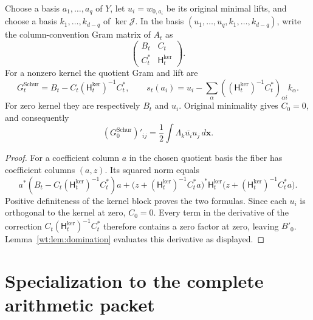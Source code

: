 \begin{proposition}
\label{wt:prop:Schur}
Choose a basis $a_1,\ldots,a_q$ of $Y$, let $u_i=w_{0,a_i}$
be its original minimal lifts, and choose a basis
$k_1,\ldots,k_{d-q}$ of $\ker\mathcal J$.  In the basis
$(u_1,\ldots,u_q,k_1,\ldots,k_{d-q})$, write the column-convention
Gram matrix of $A_t$ as
\[
 \begin{pmatrix}B_t&C_t\\C_t^*&\mathsf H_t^{\mathrm{ker}}\end{pmatrix}.
\]
For a nonzero kernel the quotient Gram and lift are
\begin{equation}\label{wt:eq:Schur}
 G_t^{\mathrm{Schur}}=B_t-C_t(\mathsf H_t^{\mathrm{ker}})^{-1}C_t^*,
 \qquad
 s_t(a_i)=u_i-\sum_\alpha
   ((\mathsf H_t^{\mathrm{ker}})^{-1}C_t^*)_{\alpha i}k_\alpha.
\end{equation}
For zero kernel they are respectively $B_t$ and $u_i$.
Original minimality gives $C_0=0$, and consequently
\[
 (G_0^{\mathrm{Schur}})'_{ij}
 =\frac12\int\Lambda_k\overline{u_i}u_j\,d\mathbf x.
\]
\end{proposition}

\begin{proof}
For a coefficient column $a$ in the chosen quotient basis the
fiber has coefficient columns $(a,z)$.  Its squared norm equals
\[
 a^*(B_t-C_t(\mathsf H_t^{\mathrm{ker}})^{-1}C_t^*)a
 +\bigl(z+(\mathsf H_t^{\mathrm{ker}})^{-1}C_t^*a\bigr)^*
 \mathsf H_t^{\mathrm{ker}}
 \bigl(z+(\mathsf H_t^{\mathrm{ker}})^{-1}C_t^*a\bigr).
\]
Positive definiteness of the kernel block proves the two
formulas.  Since each $u_i$ is orthogonal to the kernel at zero,
$C_0=0$.  Every term in the derivative of the correction
$C_t(\mathsf H_t^{\mathrm{ker}})^{-1}C_t^*$ therefore contains a zero
factor at zero, leaving $B'_0$.  Lemma~\ref{wt:lem:domination}
evaluates this derivative as displayed.
\end{proof}

\section{Specialization to the complete arithmetic packet}
\label{wt:sec:packet}

